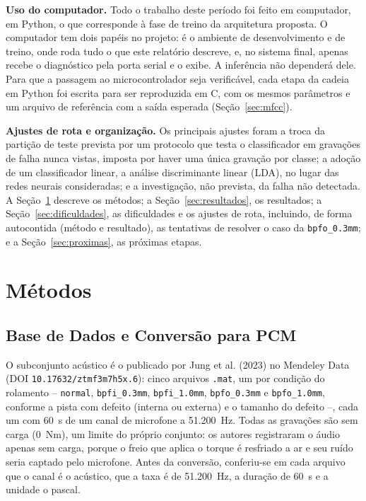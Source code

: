 \documentclass[12pt,a4paper]{article}
\begin{document}
\textbf{Uso do computador.} Todo o trabalho deste período foi feito em computador, em Python, o que corresponde à fase de treino da arquitetura proposta. O computador tem dois papéis no projeto: é o ambiente de desenvolvimento e de treino, onde roda tudo o que este relatório descreve, e, no sistema final, apenas recebe o diagnóstico pela porta serial e o exibe. A inferência não dependerá dele. Para que a passagem ao microcontrolador seja verificável, cada etapa da cadeia em Python foi escrita para ser reproduzida em C, com os mesmos parâmetros e um arquivo de referência com a saída esperada (Seção~\ref{sec:mfcc}).

\textbf{Ajustes de rota e organização.} Os principais ajustes foram a troca da partição de teste prevista por um protocolo que testa o classificador em gravações de falha nunca vistas, imposta por haver uma única gravação por classe; a adoção de um classificador linear, a análise discriminante linear (LDA), no lugar das redes neurais consideradas; e a investigação, não prevista, da falha não detectada. A Seção~\ref{sec:metodos} descreve os métodos; a Seção~\ref{sec:resultados}, os resultados; a Seção~\ref{sec:dificuldades}, as dificuldades e os ajustes de rota, incluindo, de forma autocontida (método e resultado), as tentativas de resolver o caso da \texttt{bpfo\_0.3mm}; e a Seção~\ref{sec:proximas}, as próximas etapas.

\section{Métodos}
\label{sec:metodos}

\subsection{Base de Dados e Conversão para PCM}
\label{sec:base}

O subconjunto acústico é o publicado por Jung et al. (2023) no Mendeley Data (DOI \texttt{10.17632/ztmf3m7h5x.6}): cinco arquivos \texttt{.mat}, um por condição do rolamento -- \texttt{normal}, \texttt{bpfi\_0.3mm}, \texttt{bpfi\_1.0mm}, \texttt{bpfo\_0.3mm} e \texttt{bpfo\_1.0mm}, conforme a pista com defeito (interna ou externa) e o tamanho do defeito --, cada um com 60~s de um canal de microfone a 51.200~Hz. Todas as gravações são sem carga (0~Nm), um limite do próprio conjunto: os autores registraram o áudio apenas sem carga, porque o freio que aplica o torque é resfriado a ar e seu ruído seria captado pelo microfone. Antes da conversão, conferiu-se em cada arquivo que o canal é o acústico, que a taxa é de 51.200~Hz, a duração de 60~s e a unidade o pascal.
\end{document}
